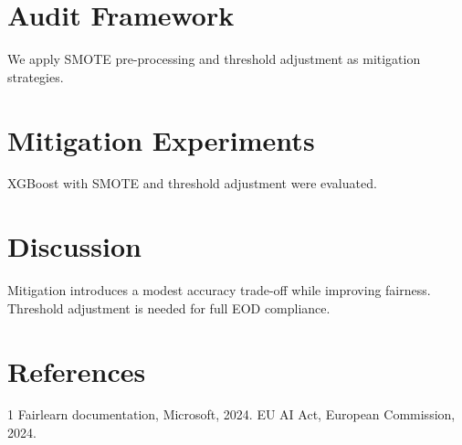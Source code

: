 \documentclass[conference]{IEEEtran}
\begin{document}
\section{Audit Framework}
We apply SMOTE pre-processing and threshold adjustment as mitigation strategies.

\section{Mitigation Experiments}
XGBoost with SMOTE and threshold adjustment were evaluated.

\section{Discussion}
Mitigation introduces a modest accuracy trade-off while improving fairness. Threshold adjustment is needed for full EOD compliance.

\section{References}
\begin{thebibliography}{1}
 Fairlearn documentation, Microsoft, 2024.
 EU AI Act, European Commission, 2024.
\end{thebibliography}
\end{document}
